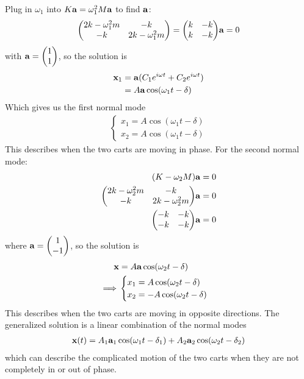 \documentclass[../main.tex]{subfiles}
\begin{document}
Plug in $\omega_1$ into $K \vb a = \omega_1^2 M \vb a$ to find $\vb a$:
\begin{align*}
    \mqty(2k - \omega_1^2 m & -k \\ -k & 2k - \omega_1^2 m) = \mqty(k & -k \\ k & -k) \vb a = 0
\end{align*}
with $\vb a = \mqty(1 \\ 1)$, so the solution is
\begin{align*}
    \vb x_1 &= \vb a (C_1 e^{i\omega t} + C_2 e^{i\omega t}) \\
    &= A \vb a \cos(\omega_1 t - \delta)
\end{align*}
Which gives us the first normal mode
\begin{align*}
    \begin{cases}
        x_1 = A \cos(\omega_1 t - \delta) \\
        x_2 = A \cos(\omega_1 t - \delta)
    \end{cases}
\end{align*}
This describes when the two carts are moving in phase. 
For the second normal mode:
\begin{align*}
    (K - \omega_2 M) \vb a = 0 \\
    \mqty(2k - \omega_2^2 m & -k \\ -k & 2k - \omega_2^2 m) \vb a = 0 \\
    \mqty(-k & -k \\ -k & -k) \vb a = 0
\end{align*}
where $\vb a = \mqty(1 \\ -1)$, so the solution is
\begin{align*}
    \vb x &= A \vb a \cos(\omega_2 t - \delta) \\
    \implies &\begin{cases}
        x_1 = A \cos(\omega_2 t - \delta) \\
        x_2 = -A \cos(\omega_2 t - \delta)
    \end{cases}
\end{align*}
This describes when the two carts are moving in opposite directions. The generalized solution is a 
linear combination of the normal modes
\begin{align*}
    \vb x(t) = A_1 \vb a_1 \cos(\omega_1 t - \delta_1) + A_2 \vb a_2 \cos(\omega_2 t - \delta_2)
\end{align*}
which can describe the complicated motion of the two carts when they are not completely in or out of
phase. 
\end{document}
